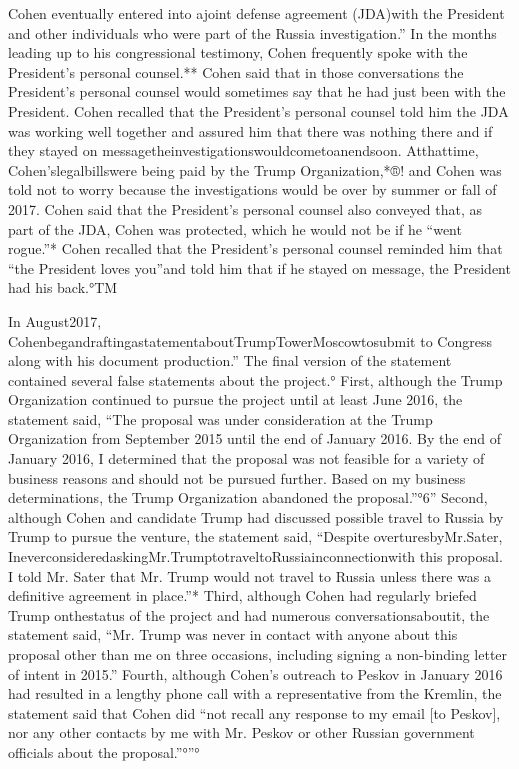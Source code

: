 Cohen eventually entered into ajoint defense agreement (JDA)with the President and other individuals who were part of the Russia investigation.”
In the months leading up to his congressional testimony, Cohen frequently spoke with the President's personal counsel.**
Cohen said that in those conversations the President's personal counsel would sometimes say that he had just been with the President.
Cohen recalled that the President's personal counsel told him the JDA was working well together and assured him that there was nothing there and if they stayed on messagetheinvestigationswouldcometoanendsoon.
Atthattime, Cohen'slegalbillswere being paid by the Trump Organization,*®! and Cohen was told not to worry because the investigations would be over by summer or fall of 2017.
Cohen said that the President's personal counsel also conveyed that, as part of the JDA, Cohen was protected, which he would not be if he “went rogue.”*
Cohen recalled that the President's personal counsel reminded him that “the President loves you”and told him that if he stayed on message, the President had his back.°TM

In August2017, CohenbegandraftingastatementaboutTrumpTowerMoscowtosubmit to Congress along with his document production.”
The final version of the statement contained several false statements about the project.°
First, although the Trump Organization continued to pursue the project until at least June 2016, the statement said, “The proposal was under consideration at the Trump Organization from September 2015 until the end of January 2016.
By the end of January 2016, I determined that the proposal was not feasible for a variety of business reasons and should not be pursued further.
Based on my business determinations, the Trump Organization abandoned the proposal.”°6”
Second, although Cohen and candidate Trump had discussed possible travel to Russia by Trump to pursue the venture, the statement said, “Despite overturesbyMr.Sater, IneverconsideredaskingMr.TrumptotraveltoRussiainconnectionwith this proposal.
I told Mr. Sater that Mr. Trump would not travel to Russia unless there was a definitive agreement in place.”*
Third, although Cohen had regularly briefed Trump onthestatus of the project and had numerous conversationsaboutit, the statement said, “Mr. Trump was never in contact with anyone about this proposal other than me on three occasions, including signing a non-binding letter of intent in 2015.”
Fourth, although Cohen's outreach to Peskov in January 2016 had resulted in a lengthy phone call with a representative from the Kremlin, the statement said that Cohen did “not recall any response to my email [to Peskov], nor any other contacts by me with Mr. Peskov or other Russian government officials about the proposal.”°”°

